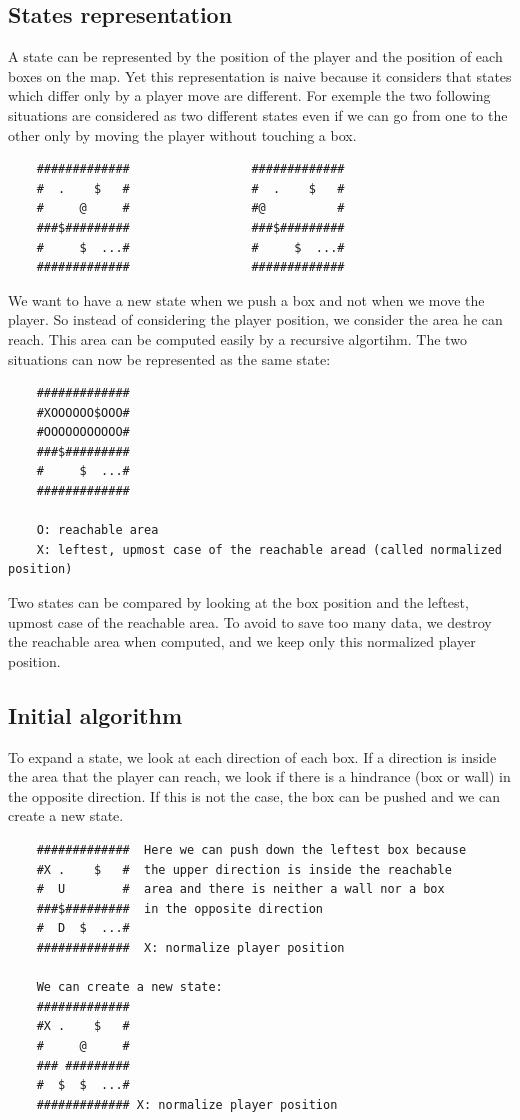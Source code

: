 \documentclass[a4paper,10pt]{article}
\begin{document}
	\subsection{States representation}
	A state can be represented by the position of the player and the position of each boxes on the map. 
	Yet this representation is naive because it considers that states which differ only by a player move are different.
	For exemple the two following situations are considered as two different states even if we can go from one to the other only by moving the 
	player without touching a box.
	\begin{verbatim}
	#############                 #############
	#  .    $   #                 #  .    $   #
	#     @     #                 #@          #
	###$#########                 ###$#########
	#     $  ...#                 #     $  ...#
	#############                 #############
	\end{verbatim}
	

	We want to have a new state when we push a box and not when we move the player.
	So instead of considering the player position, we consider the area he can reach.
	This area can be computed easily by a recursive algortihm.
	The two situations can now be represented as the same state:
	\begin{verbatim}
	#############
	#XOOOOOO$OOO#
	#OOOOOOOOOOO#
	###$#########
	#     $  ...#
	#############

	O: reachable area
	X: leftest, upmost case of the reachable aread (called normalized position)
	\end{verbatim}
	Two states can be compared by looking at the box position and the leftest, upmost case of the reachable area.
	To avoid to save too many data, we destroy the reachable area when computed, and we keep only this normalized player position.

	
	\subsection{Initial algorithm}
	To expand a state, we look at each direction of each box. 
	If a direction is inside the area that the player can reach, we look if there is a hindrance (box or wall) in the opposite direction.
	If this is not the case, the box can be pushed and we can create a new state.

	\begin{verbatim}
	#############  Here we can push down the leftest box because 
	#X .    $   #  the upper direction is inside the reachable 
	#  U        #  area and there is neither a wall nor a box
	###$#########  in the opposite direction
	#  D  $  ...#  
	#############  X: normalize player position

	We can create a new state:
	#############
	#X .    $   #
	#     @     #
	### #########
	#  $  $  ...#
	############# X: normalize player position
	\end{verbatim}
\end{document}
